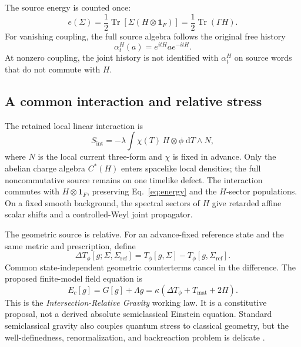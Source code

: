 \documentclass[11pt]{article}
\theoremstyle{definition}
\theoremstyle{remark}
\newcommand{\Tr}{\operatorname{Tr}}
\newcommand{\id}{\mathbf{1}}
\newcommand{\dd}{\mathrm{d}}
\begin{document}
The source energy is counted once:
\begin{equation}\label{eq:energy}
  e(\Sigma)=\frac12\Tr\!\left[\Sigma(H\otimes\id_F)\right]
  =\frac12\Tr(\Gamma H).
\end{equation}
For vanishing coupling, the full source algebra follows the original free history
\begin{equation}
  \alpha_t^H(a)=e^{itH}a e^{-itH}.
\end{equation}
At nonzero coupling, the joint history is not identified with $\alpha_t^H$ on source words that do not commute with $H$.

\subsection{A common interaction and relative stress}

The retained local linear interaction is
\begin{equation}\label{eq:interaction}
  S_{\mathrm{int}}=-\lambda\int \chi(T)\,H\otimes\phi\;\dd T\wedge N,
\end{equation}
where $N$ is the local current three-form and $\chi$ is fixed in advance. Only the abelian charge algebra $C^*(H)$ enters spacelike local densities; the full noncommutative source remains on one timelike defect. The interaction commutes with $H\otimes\id_F$, preserving Eq.~\eqref{eq:energy} and the $H$-sector populations. On a fixed smooth background, the spectral sectors of $H$ give retarded affine scalar shifts and a controlled-Weyl joint propagator.

The geometric source is relative. For an advance-fixed reference state and the same metric and prescription, define
\begin{equation}
  \Delta T_\phi[g;\Sigma,\Sigma_{\mathrm{ref}}]
  =T_\phi[g,\Sigma]-T_\phi[g,\Sigma_{\mathrm{ref}}].
\end{equation}
Common state-independent geometric counterterms cancel in the difference. The proposed finite-model field equation is
\begin{equation}\label{eq:gravity}
  E_c[g]=G[g]+\Lambda g
  =\kappa\left(\Delta T_\phi+T_{\mathrm{mat}}+2\Pi\right).
\end{equation}
This is the \emph{Intersection-Relative Gravity} working law. It is a constitutive proposal, not a derived absolute semiclassical Einstein equation. Standard semiclassical gravity also couples quantum stress to classical geometry, but the well-definedness, renormalization, and backreaction problem is delicate \cite{hollandswald2001,pinamontisiemssen2021,meda2026}.
\end{document}
